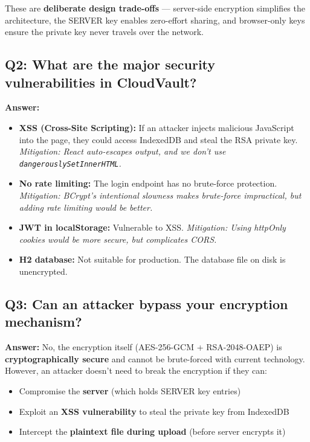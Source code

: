 \documentclass[11pt,a4paper]{article}
\begin{document}
These are \textbf{deliberate design trade-offs} --- server-side encryption simplifies the architecture, the SERVER key enables zero-effort sharing, and browser-only keys ensure the private key never travels over the network.

\subsection{Q2: What are the major security vulnerabilities in CloudVault?}

\textbf{Answer:}
\begin{itemize}
  \item \textbf{XSS (Cross-Site Scripting):} If an attacker injects malicious JavaScript into the page, they could access IndexedDB and steal the RSA private key. \textit{Mitigation: React auto-escapes output, and we don't use \texttt{dangerouslySetInnerHTML}.}
  \item \textbf{No rate limiting:} The login endpoint has no brute-force protection. \textit{Mitigation: BCrypt's intentional slowness makes brute-force impractical, but adding rate limiting would be better.}
  \item \textbf{JWT in localStorage:} Vulnerable to XSS. \textit{Mitigation: Using httpOnly cookies would be more secure, but complicates CORS.}
  \item \textbf{H2 database:} Not suitable for production. The database file on disk is unencrypted.
\end{itemize}

\subsection{Q3: Can an attacker bypass your encryption mechanism?}

\textbf{Answer:} No, the encryption itself (AES-256-GCM + RSA-2048-OAEP) is \textbf{cryptographically secure} and cannot be brute-forced with current technology. However, an attacker doesn't need to break the encryption if they can:
\begin{itemize}
  \item Compromise the \textbf{server} (which holds SERVER key entries)
  \item Exploit an \textbf{XSS vulnerability} to steal the private key from IndexedDB
  \item Intercept the \textbf{plaintext file during upload} (before server encrypts it)
\end{itemize}
\end{document}
